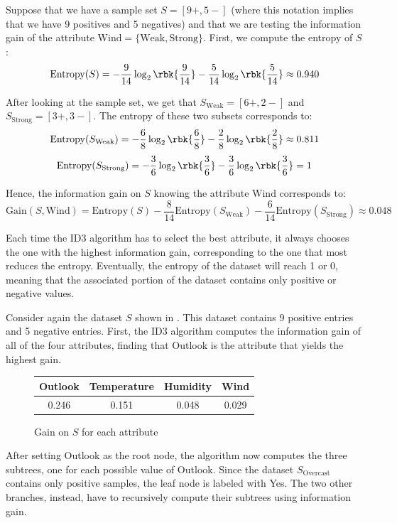 \documentclass[a4paper, 12pt]{report}
\begin{document}
    Suppose that we have a sample set $S = [9+, 5-]$ (where this notation implies that we have 9 positives and 5 negatives) and that we are testing the information gain of the attribute $\mathrm{Wind} = \{\mathrm{Weak}, \mathrm{Strong}\}$. First, we compute the entropy of $S$:
    \[\mathrm{Entropy}(S) = -\frac{9}{14} \log_2 \rbk{\frac{9}{14}} - \frac{5}{14} \log_2 \rbk{\frac{5}{14}} \approx 0.940\] 
    
    After looking at the sample set, we get that $S_{\mathrm{Weak}} = [6+, 2-]$ and $S_{\mathrm{Strong}} = [3+, 3-]$. The entropy of these two subsets corresponds to:
    \[\mathrm{Entropy}(S_{\mathrm{Weak}}) = -\frac{6}{8} \log_2 \rbk{\frac{6}{8}} - \frac{2}{8} \log_2 \rbk{\frac{2}{8}} \approx 0.811\] 
    \[\mathrm{Entropy}(S_{\mathrm{Strong}}) = -\frac{3}{6} \log_2 \rbk{\frac{3}{6}} - \frac{3}{6} \log_2 \rbk{\frac{3}{6}} = 1\] 
    
    Hence, the information gain on $S$ knowing the attribute $\mathrm{Wind}$ corresponds to:
    \[\mathrm{Gain}(S,\mathrm{Wind}) = \mathrm{Entropy}(S) - \frac{8}{14} \mathrm{Entropy}(S_\mathrm{Weak}) - \frac{6}{14} \mathrm{Entropy}(S_\mathrm{Strong}) \approx 0.048\]

    Each time the ID3 algorithm has to select the best attribute, it always chooses the one with the highest information gain, corresponding to the one that most reduces the entropy. Eventually, the entropy of the  dataset will reach 1 or 0, meaning that the associated portion of the dataset contains only positive or negative values.

    Consider again the dataset $S$ shown in . This dataset contains 9 positive entries and 5 negative entries. First, the ID3 algorithm computes the information gain of all of the four attributes, finding that Outlook is the attribute that yields the highest gain.
    \begin{figure}[H]
        \centering
        \begin{tabular}{|c|c|c|c|}
            \hline
            Outlook & Temperature & Humidity & Wind \\
            \hline
            0.246 & 0.151 & 0.048 & 0.029 \\
            \hline
        \end{tabular}

        \caption{Gain on $S$ for each attribute}
    \end{figure}

    After setting Outlook as the root node, the algorithm now computes the three subtrees, one for each possible value of Outlook. Since the dataset $S_{\mathrm{Overcast}}$ contains only positive samples, the leaf node is labeled with Yes. The two other branches, instead, have to recursively compute their subtrees using information gain.
\end{document}
